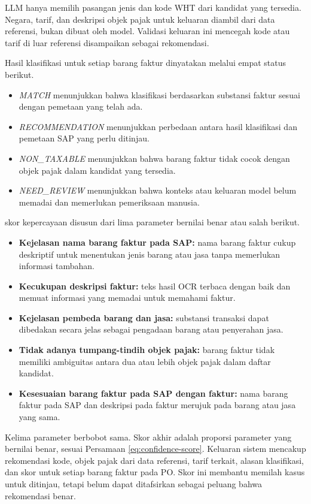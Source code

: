LLM hanya memilih pasangan jenis dan kode WHT dari kandidat yang tersedia. Negara, tarif, dan deskripsi objek pajak untuk keluaran diambil dari data referensi, bukan dibuat oleh model. Validasi keluaran ini mencegah kode atau tarif di luar referensi disampaikan sebagai rekomendasi.


Hasil klasifikasi untuk setiap barang faktur dinyatakan melalui empat status berikut.
\begin{itemize}
    \item \textit{MATCH} menunjukkan bahwa klasifikasi berdasarkan substansi faktur sesuai dengan pemetaan yang telah ada.
    \item \textit{RECOMMENDATION} menunjukkan perbedaan antara hasil klasifikasi dan pemetaan SAP yang perlu ditinjau.
    \item \textit{NON\_TAXABLE} menunjukkan bahwa barang faktur tidak cocok dengan objek pajak dalam kandidat yang tersedia.
    \item \textit{NEED\_REVIEW} menunjukkan bahwa konteks atau keluaran model belum memadai dan memerlukan pemeriksaan manusia.
\end{itemize}

skor kepercayaan disusun dari lima parameter bernilai benar atau salah berikut.
\begin{itemize}
    \item \textbf{Kejelasan nama barang faktur pada SAP:} nama barang faktur cukup deskriptif untuk menentukan jenis barang atau jasa tanpa memerlukan informasi tambahan.
    \item \textbf{Kecukupan deskripsi faktur:} teks hasil OCR terbaca dengan baik dan memuat informasi yang memadai untuk memahami faktur.
    \item \textbf{Kejelasan pembeda barang dan jasa:} substansi transaksi dapat dibedakan secara jelas sebagai pengadaan barang atau penyerahan jasa.
    \item \textbf{Tidak adanya tumpang-tindih objek pajak:} barang faktur tidak memiliki ambiguitas antara dua atau lebih objek pajak dalam daftar kandidat.
    \item \textbf{Kesesuaian barang faktur pada SAP dengan faktur:} nama barang faktur pada SAP dan deskripsi pada faktur merujuk pada barang atau jasa yang sama.
\end{itemize}

Kelima parameter berbobot sama. Skor akhir adalah proporsi parameter yang bernilai benar, sesuai Persamaan \ref{eq:confidence-score}. Keluaran sistem mencakup rekomendasi kode, objek pajak dari data referensi, tarif terkait, alasan klasifikasi, dan skor untuk setiap barang faktur pada PO. Skor ini membantu memilah kasus untuk ditinjau, tetapi belum dapat ditafsirkan sebagai peluang bahwa rekomendasi benar.

